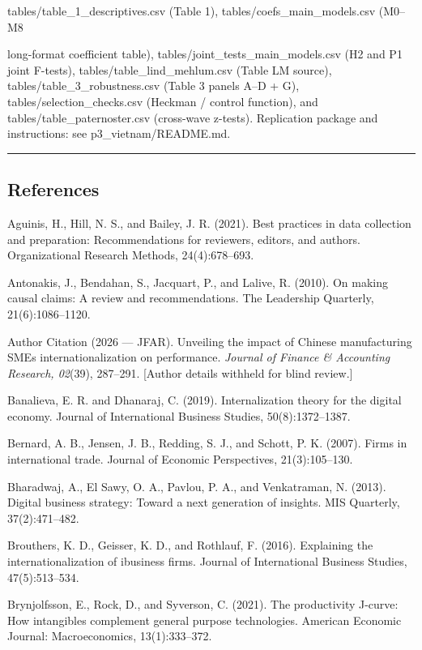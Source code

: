 \documentclass[12pt,a4paper]{article}
\begin{document}
tables/table\_1\_descriptives.csv (Table 1),
tables/coefs\_main\_models.csv (M0--M8

long-format coefficient table), tables/joint\_tests\_main\_models.csv
(H2 and P1 joint F-tests), tables/table\_lind\_mehlum.csv (Table LM
source), tables/table\_3\_robustness.csv (Table 3 panels A--D + G),
tables/selection\_checks.csv (Heckman / control function), and
tables/table\_paternoster.csv (cross-wave z-tests). Replication package
and instructions: see p3\_vietnam/README.md.

\begin{center}\rule{0.5\linewidth}{0.5pt}\end{center}

\hypertarget{references}{%
\subsection{References}\label{references}}

Aguinis, H., Hill, N. S., and Bailey, J. R. (2021). Best practices in
data collection and preparation: Recommendations for reviewers, editors,
and authors. Organizational Research Methods, 24(4):678--693.

Antonakis, J., Bendahan, S., Jacquart, P., and Lalive, R. (2010). On
making causal claims: A review and recommendations. The Leadership
Quarterly, 21(6):1086--1120.

Author Citation (2026 --- JFAR). Unveiling the impact of Chinese
manufacturing SMEs\textquotesingle{} internationalization on
performance. \emph{Journal of Finance \& Accounting Research, 02}(39),
287--291. {[}Author details withheld for blind review.{]}

Banalieva, E. R. and Dhanaraj, C. (2019). Internalization theory for the
digital economy. Journal of International Business Studies,
50(8):1372--1387.

Bernard, A. B., Jensen, J. B., Redding, S. J., and Schott, P. K. (2007).
Firms in international trade. Journal of Economic Perspectives,
21(3):105--130.

Bharadwaj, A., El Sawy, O. A., Pavlou, P. A., and Venkatraman, N.
(2013). Digital business strategy: Toward a next generation of insights.
MIS Quarterly, 37(2):471--482.

Brouthers, K. D., Geisser, K. D., and Rothlauf, F. (2016). Explaining
the internationalization of ibusiness firms. Journal of International
Business Studies, 47(5):513--534.

Brynjolfsson, E., Rock, D., and Syverson, C. (2021). The productivity
J-curve: How intangibles complement general purpose technologies.
American Economic Journal: Macroeconomics, 13(1):333--372.
\end{document}
